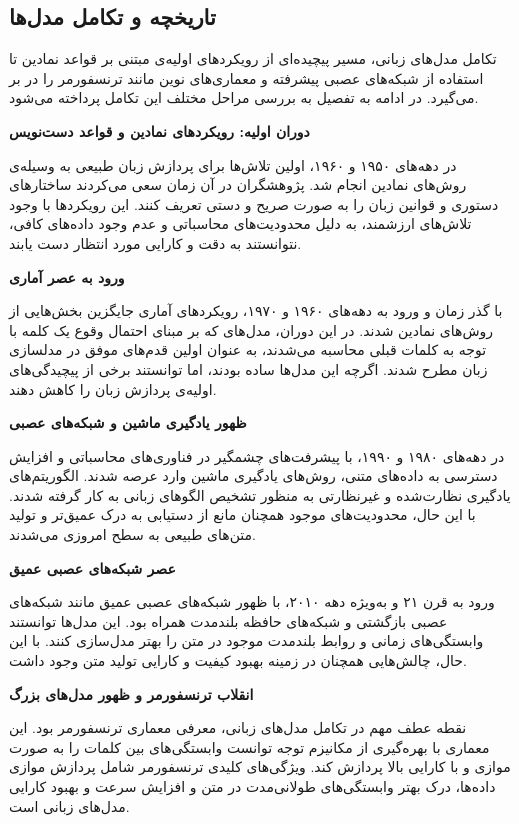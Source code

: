 \subsection{تاریخچه و تکامل مدل‌ها}

تکامل مدل‌های زبانی، مسیر پیچیده‌ای از رویکردهای اولیه‌ی مبتنی بر قواعد نمادین تا استفاده از شبکه‌های عصبی پیشرفته و معماری‌های نوین مانند ترنسفورمر را در بر می‌گیرد. در ادامه به تفصیل به بررسی مراحل مختلف این تکامل پرداخته می‌شود.

\textbf{دوران اولیه: رویکردهای نمادین و قواعد دست‌نویس}

\noindent در دهه‌های ۱۹۵۰ و ۱۹۶۰، اولین تلاش‌ها برای پردازش زبان طبیعی به وسیله‌ی روش‌های نمادین انجام شد. پژوهشگران در آن زمان سعی می‌کردند ساختارهای دستوری و قوانین زبان را به صورت صریح و دستی تعریف کنند. این رویکردها با وجود تلاش‌های ارزشمند، به دلیل محدودیت‌های محاسباتی و عدم وجود داده‌های کافی، نتوانستند به دقت و کارایی مورد انتظار دست یابند.

\textbf{ورود به عصر آماری}

\noindent با گذر زمان و ورود به دهه‌های ۱۹۶۰ و ۱۹۷۰، رویکردهای آماری جایگزین بخش‌هایی از روش‌های نمادین شدند. در این دوران، مدل‌های  که بر مبنای احتمال وقوع یک کلمه با توجه به کلمات قبلی محاسبه می‌شدند، به عنوان اولین قدم‌های موفق در مدلسازی زبان مطرح شدند. اگرچه این مدل‌ها ساده بودند، اما توانستند برخی از پیچیدگی‌های اولیه‌ی پردازش زبان را کاهش دهند.

\textbf{ظهور یادگیری ماشین و شبکه‌های عصبی}

\noindent در دهه‌های ۱۹۸۰ و ۱۹۹۰، با پیشرفت‌های چشمگیر در فناوری‌های محاسباتی و افزایش دسترسی به داده‌های متنی، روش‌های یادگیری ماشین وارد عرصه شدند. الگوریتم‌های یادگیری نظارت‌شده و غیرنظارتی به منظور تشخیص الگوهای زبانی به کار گرفته شدند. با این حال، محدودیت‌های موجود همچنان مانع از دستیابی به درک عمیق‌تر و تولید متن‌های طبیعی به سطح امروزی می‌شدند.

\textbf{عصر شبکه‌های عصبی عمیق}

\noindent ورود به قرن ۲۱ و به‌ویژه دهه ۲۰۱۰، با ظهور شبکه‌های عصبی عمیق مانند شبکه‌های عصبی بازگشتی
 و شبکه‌های حافظه بلندمدت
  همراه بود. این مدل‌ها توانستند وابستگی‌های زمانی و روابط بلندمدت موجود در متن را بهتر مدل‌سازی کنند. با این حال، چالش‌هایی همچنان در زمینه بهبود کیفیت و کارایی تولید متن وجود داشت.

\textbf{انقلاب ترنسفورمر و ظهور مدل‌های بزرگ}

\noindent نقطه عطف مهم در تکامل مدل‌های زبانی، معرفی معماری ترنسفورمر 
\cite{attention}
 بود. این معماری با بهره‌گیری از مکانیزم توجه
  توانست وابستگی‌های بین کلمات را به صورت موازی و با کارایی بالا پردازش کند. ویژگی‌های کلیدی ترنسفورمر شامل پردازش موازی داده‌ها، درک بهتر وابستگی‌های طولانی‌مدت در متن و افزایش سرعت و بهبود کارایی مدل‌های زبانی است.

